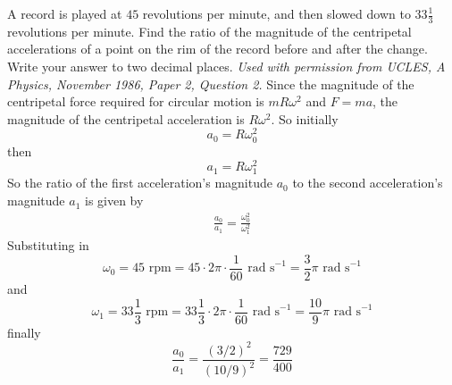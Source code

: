 
\begin{problem}
{A record is played at $45$ revolutions per minute, and then slowed down to $33\frac{1}{3}$ revolutions per minute. Find the ratio of the magnitude of the centripetal accelerations of a point on the rim of the record before and after the change. Write your answer to two decimal places.} 
{\textit{Used with permission from UCLES, A Physics, November 1986, Paper 2, Question 2.}}
{Since the magnitude of the centripetal force required for circular motion is $mR\omega^2$ and $F=ma$, the magnitude of the centripetal acceleration is $R\omega^2$. So initially
\begin{equation*} a_0=R\omega_0^2 \end{equation*}
then 
\begin{equation*} a_1=R\omega_1^2 \end{equation*}
So the ratio of the first acceleration's magnitude $a_0$ to the second acceleration's magnitude $a_1$ is given by 
\begin{align*} \frac{a_0}{a_1}=\frac{\omega_0^2}{\omega_1^2} \end{align*}
Substituting in 
\begin{equation*}
\omega_0=45\textrm{ rpm}=45\cdot2\pi\cdot\frac{1}{60}\textrm{ rad s}^{-1}=\frac{3}{2}\pi\textrm{ rad s}^{-1}
\end{equation*} and
\begin{equation*}
\omega_1=33\frac{1}{3}\textrm{ rpm}=33\frac{1}{3}\cdot2\pi\cdot\frac{1}{60}\textrm{ rad s}^{-1}=\frac{10}{9}\pi\textrm{ rad s}^{-1}
\end{equation*}
finally
\begin{equation*} \frac{a_0}{a_1}=\frac{(3/2)^2}{(10/9)^2}=\frac{729}{400} \end{equation*}
}
\end{problem}